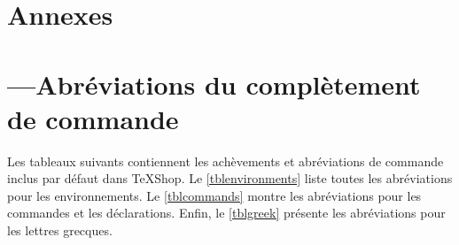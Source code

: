 \documentclass[11pt,french]{article}
\newcommand{\TS}{\textsf{\TeX Shop}}
\newcommand{\cmd}[1]{\textsf{#1}}
\begin{document}
\section*{Annexes}
\appendix

\section{---\quad Abréviations du complètement de commande}\label{secCCTables}
%
%

Les tableaux suivants contiennent les achèvements et abréviations de commande inclus par défaut dans \TS. Le \cref{tblenvironments}  liste toutes les abréviations pour les environnements. Le \cref{tblcommands}  montre les abréviations pour les commandes et les déclarations. Enfin, le \cref{tblgreek}  présente les abréviations pour les lettres grecques.
\end{document}
